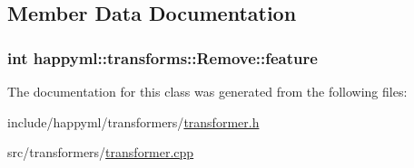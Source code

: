 \subsection{Member Data Documentation}
\subsubsection[{\texorpdfstring{feature}{feature}}]{\setlength{\rightskip}{0pt plus 5cm}int happyml\+::transforms\+::\+Remove\+::feature\hspace{0.3cm}{\ttfamily [protected]}}\hypertarget{classhappyml_1_1transforms_1_1Remove_a4fbe1173bd54762002025be350dd13d5}{}\label{classhappyml_1_1transforms_1_1Remove_a4fbe1173bd54762002025be350dd13d5}


The documentation for this class was generated from the following files\+:\begin{DoxyCompactItemize}
\item 
include/happyml/transformers/\hyperlink{transformer_8h}{transformer.\+h}\item 
src/transformers/\hyperlink{transformer_8cpp}{transformer.\+cpp}\end{DoxyCompactItemize}
